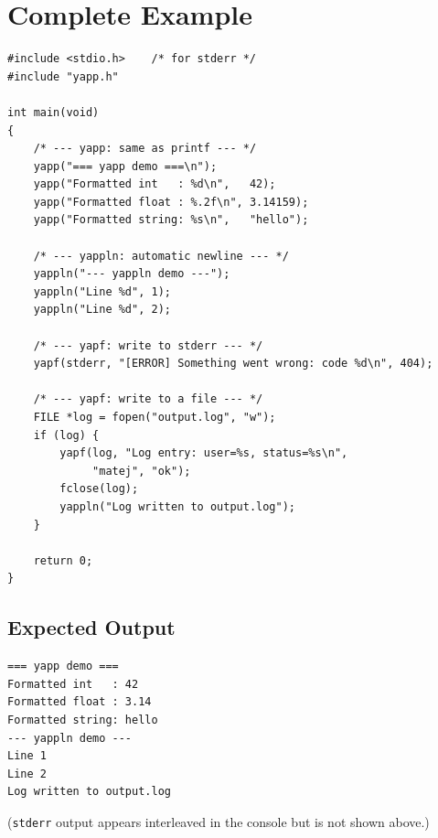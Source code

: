 \documentclass[11pt, a4paper]{article}
\begin{document}
\section{Complete Example}

\begin{tcolorbox}[codebox]
\begin{lstlisting}[caption={main.c — full example using all three functions}]
#include <stdio.h>    /* for stderr */
#include "yapp.h"

int main(void)
{
    /* --- yapp: same as printf --- */
    yapp("=== yapp demo ===\n");
    yapp("Formatted int   : %d\n",   42);
    yapp("Formatted float : %.2f\n", 3.14159);
    yapp("Formatted string: %s\n",   "hello");

    /* --- yappln: automatic newline --- */
    yappln("--- yappln demo ---");
    yappln("Line %d", 1);
    yappln("Line %d", 2);

    /* --- yapf: write to stderr --- */
    yapf(stderr, "[ERROR] Something went wrong: code %d\n", 404);

    /* --- yapf: write to a file --- */
    FILE *log = fopen("output.log", "w");
    if (log) {
        yapf(log, "Log entry: user=%s, status=%s\n",
             "matej", "ok");
        fclose(log);
        yappln("Log written to output.log");
    }

    return 0;
}
\end{lstlisting}
\end{tcolorbox}

\subsection*{Expected Output}

\begin{tcolorbox}[codebox]
\begin{lstlisting}[style=shellstyle, numbers=none]
=== yapp demo ===
Formatted int   : 42
Formatted float : 3.14
Formatted string: hello
--- yappln demo ---
Line 1
Line 2
Log written to output.log
\end{lstlisting}
\end{tcolorbox}

(\texttt{stderr} output appears interleaved in the console but is not shown above.)

\end{document}
